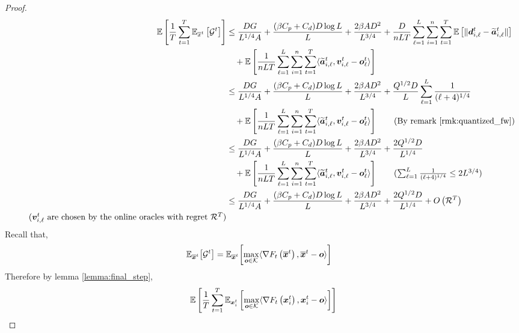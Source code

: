 \begin{proof}
\begin{align*}
    \E\left[ \frac{1}{T} \sum_{t=1}^T \E_{\overline{x}^t} \left[ \mathcal{G}^t \right] \right]
    &\leq \frac{DG}{L^{1/4}A} + \frac{(\beta C_p + C_d) D \log L}{L} + \frac{2\beta AD^2}{L^{3/4}} + \frac{D}{nLT}\sum_{\ell=1}^{L} \sum_{i=1}^n \sum_{t=1}^T  \E \left[ \|\vect{d}_{i,\ell}^t -\widetilde{\vect{a}}_{i,\ell}^t\| \right] \\
     & \quad + \E \left[ \frac{1}{nLT}\sum_{\ell=1}^{L} \sum_{i=1}^n \sum_{t=1}^T \langle \widetilde{\vect{a}}_{i,\ell}^t,\vect{v}_{i,\ell}^t - \vect{o}_{\ell}^t \rangle \right] \\
     &\leq \frac{DG}{L^{1/4}A} + \frac{(\beta C_p + C_d) D \log L}{L} + \frac{2\beta AD^2}{L^{3/4}} + \frac{Q^{1/2}D}{L}\sum_{\ell=1}^{L} \frac{1}{(\ell+4)^{1/4}} \\
     & \quad + \E \left[ \frac{1}{nLT}\sum_{\ell=1}^{L} \sum_{i=1}^n \sum_{t=1}^T \langle \widetilde{\vect{a}}_{i,\ell}^t,\vect{v}_{i,\ell}^t - \vect{o}_{\ell}^t \rangle \right]
     \tag{By remark \ref{rmk:quantized_fw}}\\
     &\leq \frac{DG}{L^{1/4}A} + \frac{(\beta C_p + C_d) D \log L}{L} + \frac{2\beta AD^2}{L^{3/4}} + \frac{2Q^{1/2}D}{L^{1/4}}  \\
     & \quad + \E \left[ \frac{1}{nLT}\sum_{\ell=1}^{L} \sum_{i=1}^n \sum_{t=1}^T \langle \widetilde{\vect{a}}_{i,\ell}^t,\vect{v}_{i,\ell}^t - \vect{o}_{\ell}^t \rangle \right]
     \tag{$\sum_{\ell=1}^L \frac{1}{(\ell + 4)^{1/4}}\leq 2 L^{3/4}$}\\
     &\leq \frac{DG}{L^{1/4}A} + \frac{(\beta C_p + C_d) D \log L}{L} + \frac{2\beta AD^2}{L^{3/4}} + \frac{2Q^{1/2}D}{L^{1/4}} + O \left(\mathcal{R}^T\right) \\
     \tag{$\vect{v}^t_{i,\ell}$ are chosen by the online oracles with regret $\mathcal{R}^T$}
\end{align*}
%
Recall that, 
\begin{align*}
    \mathbb{E}_{\overline{\bm{x}}^t}{ \left[ \mathcal{G}^t \right]}
    &= \mathbb{E}_{\overline{\bm{x}}^t}{\left[ \max_{\bm{o} \in \mathcal{K}} \langle \nabla F_t\left( \overline{\bm{x}}^t \right), \overline{\bm{x}}^t - \bm{o} \rangle \right]} 
\end{align*}
Therefore by lemma \ref{lemma:final_step}, 
\begin{align*}
    \E \left[ \frac{1}{T} \sum_{t=1}^T \E_{\vect{x}_i^t}\left[ \max_{\vect{o} \in \mathcal{K}} \langle \nabla F_t\left( \vect{x}_i^t \right), \vect{x}_i^t - \vect{o} \rangle \right] \right]

\end{align*}
\end{proof}

